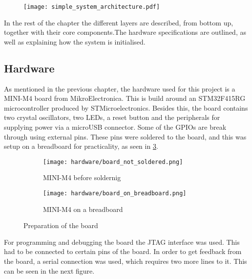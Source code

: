  
\begin{figure}[H]
\centering
\texttt{[image: simple\_system\_architecture.pdf]}
\end{figure}

In the rest of the chapter the different layers are described,
from bottom up, 
together with their core components.The hardware specifications
are outlined, as well as explaining how the system is initialised.

\subsection{Hardware}
As mentioned in the previous chapter, the hardware used for this project 
is a MINI-M4 board from MikroElectronica. This is build around an
STM32F415RG microcontroller produced by STMicroelectronics. Besides
this, the board contains two crystal oscillators, two LEDs, a reset 
button and the peripherals for supplying power via a microUSB connector.
Some of the GPIOs are break through using external pins.
These pins were soldered to the board, and this was setup on a breadboard
for practicality, as seen in \ref{fig:photo1}.

\begin{figure}[H]
\begin{subfigure}{0.5\textwidth}
  \centering
  \texttt{[image: hardware/board\_not\_soldered.png]}
  \caption{MINI-M4 before soldernig}
  \label{fig:sub1}
\end{subfigure}%
\begin{subfigure}{0.5\textwidth}
  \centering
  \texttt{[image: hardware/board\_on\_breadboard.png]}
  \caption{MINI-M4 on a breadboard}
  \label{fig:sub2}
\end{subfigure}
\caption{Preparation of the board}
\label{fig:photo1}
\end{figure}

For programming and debugging the board the JTAG interface was used.
This had to be connected to certain pins of the board. In order to get 
feedback from the board, a serial connection was used, which requires two
more lines to it. This can be seen in the next figure.

